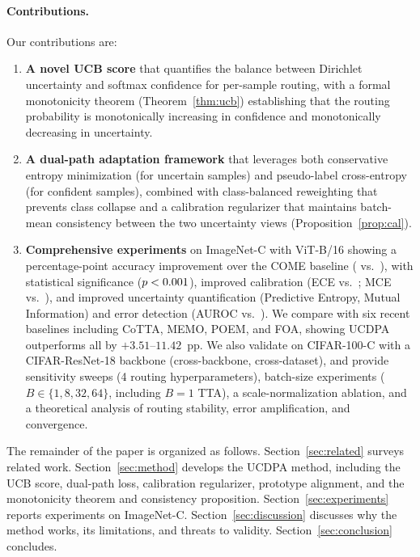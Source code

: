 \paragraph{Contributions.} Our contributions are:
\begin{enumerate}[leftmargin=*,topsep=2pt,itemsep=2pt]
  \item \textbf{A novel UCB score} that quantifies the balance between Dirichlet uncertainty and softmax confidence for per-sample routing, with a formal monotonicity theorem (Theorem~\ref{thm:ucb}) establishing that the routing probability is monotonically increasing in confidence and monotonically decreasing in uncertainty.
  \item \textbf{A dual-path adaptation framework} that leverages both conservative entropy minimization (for uncertain samples) and pseudo-label cross-entropy (for confident samples), combined with class-balanced reweighting that prevents class collapse and a calibration regularizer that maintains batch-mean consistency between the two uncertainty views (Proposition~\ref{prop:cal}).
  \item \textbf{Comprehensive experiments} on ImageNet-C with ViT-B/16 showing a \ucdpadelta{} percentage-point accuracy improvement over the COME baseline (\ucdpaacc{} vs.\ \comeacc{}), with statistical significance ($p < 0.001{}$), improved calibration (ECE \ucdpaece{} vs.\ \comeece{}; MCE \ucdpamce{} vs.\ \comemce{}), and improved uncertainty quantification (Predictive Entropy, Mutual Information) and error detection (AUROC \ucdpaauroc{} vs.\ \comeauroc{}). We compare with six recent baselines including CoTTA, MEMO, POEM, and FOA, showing UCDPA outperforms all by $+3.51$--$11.42$~pp. We also validate on CIFAR-100-C with a CIFAR-ResNet-18 backbone (cross-backbone, cross-dataset), and provide sensitivity sweeps (4 routing hyperparameters), batch-size experiments ($B \in \{1, 8, 32, 64\}$, including $B=1$ TTA), a scale-normalization ablation, and a theoretical analysis of routing stability, error amplification, and convergence.
\end{enumerate}

The remainder of the paper is organized as follows. Section~\ref{sec:related} surveys related work. Section~\ref{sec:method} develops the UCDPA method, including the UCB score, dual-path loss, calibration regularizer, prototype alignment, and the monotonicity theorem and consistency proposition. Section~\ref{sec:experiments} reports experiments on ImageNet-C. Section~\ref{sec:discussion} discusses why the method works, its limitations, and threats to validity. Section~\ref{sec:conclusion} concludes.
